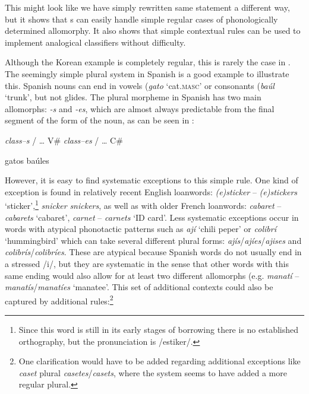 This might look like we have simply rewritten same statement a different way, but it shows that s can easily handle simple regular cases of phonologically determined allomorphy.
It also shows that simple contextual rules can be used to implement analogical classifiers without difficulty.

Although the Korean example is completely regular, this is rarely the case in . The seemingly simple plural system in Spanish is a good example to illustrate this. Spanish nouns can end in vowels (\textit{gato} `cat.\textsc{masc}' or consonants (\textit{baúl} `trunk', but not glides. The plural morpheme in Spanish has two main allomorphs: \textit{-s} and \textit{-es}, which are almost always predictable from the final segment of the  form of the noun, as can be seen in :


\begin{exe}
    \ex \label{exe-sp-plurals}
    \begin{xlist}
        \ex \textit{class--s} / \dots{} V\#
        \ex \textit{class--es} / \dots{} C\#
    \end{xlist}
    \ex
    \begin{xlist}
        \ex gatos
        \ex baúles
    \end{xlist}
\end{exe}


However, it is easy to find systematic exceptions to this simple rule. One kind of  exception is found in relatively recent English loanwords: \textit{(e)sticker} -- \textit{(e)stickers} `sticker',\footnote{Since this word is still in its early stages of borrowing there is no established orthography, but the pronunciation is /estiker/.} \textit{snicker} \textit{snickers}, as well as with older French loanwords: \textit{cabaret} -- \textit{cabarets} `cabaret', \textit{carnet} -- \textit{carnets} `ID card'. Less systematic exceptions occur in words with atypical phonotactic patterns such as \textit{ají} `chili peper' or \textit{colibrí} `hummingbird' which can take several different plural forms: \textit{ajís}/\textit{ajíes}/\textit{ajises} and \textit{colibrís}/\textit{colibríes}. These are atypical because Spanish words do not usually end in a stressed /i/, but they are systematic in the sense that other words with this same ending would also allow for at least two different allomorphs (e.g. \textit{manatí} -- \textit{manatís}/\textit{manatíes} `manatee'. This set of additional contexts could also be captured by additional rules:\footnote{One clarification would have to be added regarding additional exceptions like \textit{caset} plural \textit{casetes}/\textit{casets}, where the system seems to have added a more regular plural.}

